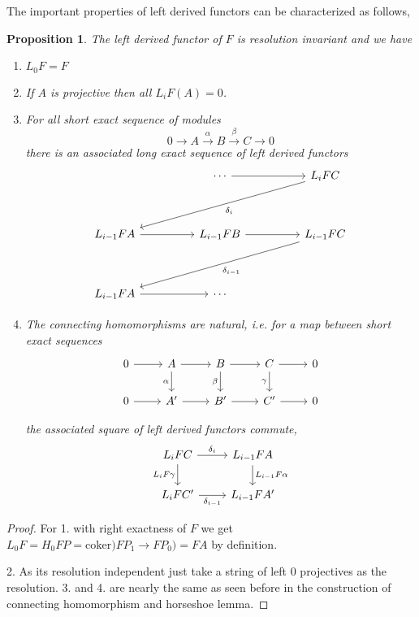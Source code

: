 \documentclass[12pt]{article}
\numberwithin{equation}{section}
\newtheorem{proposition}{Proposition}[section]
\begin{document}
	The important properties of left derived functors can be characterized as follows,
	\begin{proposition}
		The left derived functor of $F$ is resolution invariant and we have
		\begin{enumerate}
			\item $L_0F=F$
			\item If $A$ is projective then all $L_iF(A)=0$.
			\item For all short exact sequence of modules \[ 0 \to A \xrightarrow{\alpha} B \xrightarrow{\beta}  C \to 0\]there is an associated long exact sequence of left derived functors
			\[\begin{tikzcd}
				&& \cdots && {L_iFC} \\
				\\
				{L_{i-1}FA} && {L_{i-1}FB} && {L_{i-1}FC} \\
				\\
				{L_{i-1}FA} && \cdots
				\arrow[from=1-3, to=1-5]
				\arrow["{\delta_i}", from=1-5, to=3-1]
				\arrow[from=3-1, to=3-3]
				\arrow[from=3-3, to=3-5]
				\arrow["{\delta_{i-1}}", from=3-5, to=5-1]
				\arrow[from=5-1, to=5-3]
			\end{tikzcd}\]
			\item The connecting homomorphisms are natural, i.e. for a map between short exact sequences 
			\[\begin{tikzcd}
				0 & A & B & C & 0 \\
				0 & {A'} & {B'} & {C'} & 0
				\arrow[from=1-1, to=1-2]
				\arrow[from=1-2, to=1-3]
				\arrow[from=1-3, to=1-4]
				\arrow[from=1-4, to=1-5]
				\arrow[from=2-1, to=2-2]
				\arrow[from=2-2, to=2-3]
				\arrow[from=2-3, to=2-4]
				\arrow[from=2-4, to=2-5]
				\arrow["\alpha"', from=1-2, to=2-2]
				\arrow["\beta"', from=1-3, to=2-3]
				\arrow["\gamma"', from=1-4, to=2-4]
			\end{tikzcd}\]
			
			the associated square of left derived functors commute,
			\[\begin{tikzcd}
				{L_iFC} & {L_{i-1}FA} \\
				{L_iFC'} & {L_{i-1}FA'}
				\arrow["{\delta_i}", from=1-1, to=1-2]
				\arrow["{L_iF\gamma}"', from=1-1, to=2-1]
				\arrow["{\delta_{i-1}}"', from=2-1, to=2-2]
				\arrow["{L_{i-1}F\alpha}", from=1-2, to=2-2]
			\end{tikzcd}\]
		\end{enumerate}
	\end{proposition}
	\begin{proof}
		For 1. with right exactness of $F$ we get  $L_0F=H_0FP=\mathrm{coker})FP_1\to FP_0)=FA$ by definition.
		
		2. As its resolution independent just take a string of left 0 projectives as the resolution.
		3. and 4. are nearly the same as seen before in the construction of connecting  homomorphism and horseshoe lemma.
	\end{proof}
	
\end{document}
